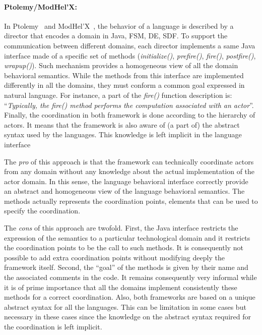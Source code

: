 \paragraph{Ptolemy/ModHel'X: }
In Ptolemy~\cite{ptoleframebib} and ModHel'X~\cite{modhelxbib}, the behavior of a language is described by a director that encodes a domain in Java, \eg FSM, DE, SDF. To support the communication between different domains, each director implements a same Java interface made of a specific set of methods (\eg \emph{initialize()}, \emph{prefire()}, \emph{fire()}, \emph{postfire()}, \emph{wrapup()}). Such mechanism provides a homogeneous view of all the domain behavioral semantics. While the methods from this interface are implemented differently in all the domains, they must conform a common goal expressed in natural language. For instance, a part of the \emph{fire()} function description is: ``\emph{Typically, the fire() method performs the computation associated with an actor}''. Finally, the coordination in both framework is done according to the hierarchy of actors. It means that the framework is also aware of (a part of) the abstract syntax used by the languages. This knowledge is left implicit in the language interface

The \emph{pro} of this approach is that the framework can technically coordinate actors from any domain without any knowledge about the actual implementation of the actor domain. In this sense, the language behavioral interface correctly provide an abstract and homogeneous view of the language behavioral semantics. The methods actually represents the coordination points, \ie  elements that can be used to specify the coordination. 

The \emph{cons} of this approach are twofold. First, the Java interface restricts the expression of the semantics to a particular technological domain and it restricts the coordination points to be the call to such methods. It is consequently not possible to add extra coordination points without modifying deeply the framework itself. Second, the ``goal'' of the methods is given by their name and the associated comments in the code. It remains consequently very informal while it is of prime importance that all the domains implement consistently these methods for a correct coordination. Also, both frameworks are based on a unique abstract syntax for all the languages. This can be limitation in some cases but necessary in these cases since the knowledge on the abstract syntax required for the coordination is left implicit.
 	
